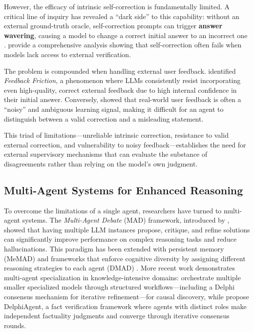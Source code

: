 However, the efficacy of intrinsic self-correction is fundamentally limited. A critical line of inquiry has revealed a ``dark side'' to this capability: without an external ground-truth oracle, self-correction prompts can trigger \textbf{answer wavering}, causing a model to change a correct initial answer to an incorrect one \citep{zhang2025understanding}. \citet{kamoi2024can} provide a comprehensive analysis showing that self-correction often fails when models lack access to external verification.

The problem is compounded when handling external user feedback. \citet{jiang2025feedback} identified \textit{Feedback Friction}, a phenomenon where LLMs consistently resist incorporating even high-quality, correct external feedback due to high internal confidence in their initial answer. Conversely, \citet{liu2025user} showed that real-world user feedback is often a ``noisy'' and ambiguous learning signal, making it difficult for an agent to distinguish between a valid correction and a misleading statement.

This triad of limitations---unreliable intrinsic correction, resistance to valid external correction, and vulnerability to noisy feedback---establishes the need for external supervisory mechanisms that can evaluate the substance of disagreements rather than relying on the model's own judgment.


\subsection{Multi-Agent Systems for Enhanced Reasoning}
\label{subsec:related-multiagent}

To overcome the limitations of a single agent, researchers have turned to multi-agent systems. The \textit{Multi-Agent Debate} (MAD) framework, introduced by \citet{du2023improving}, showed that having multiple LLM instances propose, critique, and refine solutions can significantly improve performance on complex reasoning tasks and reduce hallucinations. This paradigm has been extended with persistent memory (MeMAD) \citep{ling2025memad} and frameworks that enforce cognitive diversity by assigning different reasoning strategies to each agent (DMAD) \citep{anonymous2025dmad}. More recent work demonstrates multi-agent specialization in knowledge-intensive domains: \citet{meier2025structured} orchestrate multiple smaller specialized models through structured workflows---including a Delphi consensus mechanism for iterative refinement---for causal discovery, while \citet{xiong2025delphiagent} propose DelphiAgent, a fact verification framework where agents with distinct roles make independent factuality judgments and converge through iterative consensus rounds.

